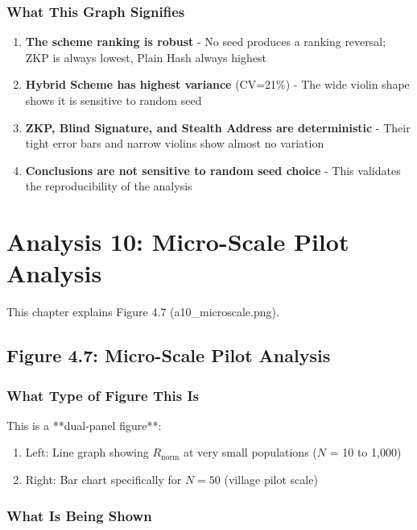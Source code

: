 \documentclass[12pt,a4paper,oneside,openany]{report}
\begin{document}
\begin{enumerate}
\subsection{What This Graph Signifies}
\begin{enumerate}
    \item \textbf{The scheme ranking is robust} - No seed produces a ranking reversal; ZKP is always lowest, Plain Hash always highest
    \item \textbf{Hybrid Scheme has highest variance} (CV=21\%) - The wide violin shape shows it is sensitive to random seed
    \item \textbf{ZKP, Blind Signature, and Stealth Address are deterministic} - Their tight error bars and narrow violins show almost no variation
    \item \textbf{Conclusions are not sensitive to random seed choice} - This validates the reproducibility of the analysis
\end{enumerate}

\chapter{Analysis 10: Micro-Scale Pilot Analysis}
\label{chap:a10}

This chapter explains Figure 4.7 (a10\_microscale.png).

\section{Figure 4.7: Micro-Scale Pilot Analysis}
\label{sec:f4.7}

\subsection{What Type of Figure This Is}
This is a **dual-panel figure**:
\begin{enumerate}
    \item Left: Line graph showing $R_{\mathrm{norm}}$ at very small populations ($N$ = 10 to 1,000)
    \item Right: Bar chart specifically for $N=50$ (village pilot scale)
\end{enumerate}

\subsection{What Is Being Shown}


\end{enumerate}
\end{document}
